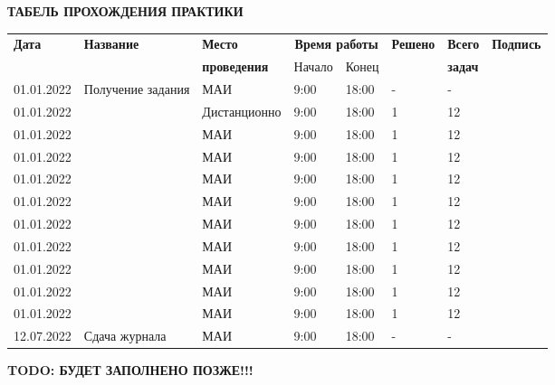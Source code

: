 \begin{center}
\bfseries{\large ТАБЕЛЬ ПРОХОЖДЕНИЯ ПРАКТИКИ}
\end{center}

\begin{longtable}{|p{1.75cm}|p{2cm}|p{2.75cm}|p{1.25cm}|p{1.25cm}|p{1.5cm}|p{1.25cm}|p{2cm}|}
    \hline
    {\bfseries Дата} & {\bfseries Название} & {\bfseries Место} & \multicolumn{2}{c|}{{\bfseries Время работы}} & {\bfseries Решено} & {\bfseries Всего} & {\bfseries Подпись}\\
    \cline {4-5} & & {\bfseries проведения} & Начало & Конец & & {\bfseries задач} & \\
    \hline
    01.01.2022 & Получение задания & МАИ & 9:00 & 18:00 & - & - & \\
    \hline
    01.01.2022 &  & Дистанционно & 9:00 & 18:00 & 1 & 12 & \\
    \hline
    01.01.2022 &  & МАИ & 9:00 & 18:00 & 1 & 12 & \\
    \hline
    01.01.2022 &  & МАИ & 9:00 & 18:00 & 1 & 12 & \\
    \hline
    01.01.2022 &  & МАИ & 9:00 & 18:00 & 1 & 12 & \\
    \hline
    01.01.2022 &  & МАИ & 9:00 & 18:00 & 1 & 12 & \\
    \hline
    01.01.2022 &  & МАИ & 9:00 & 18:00 & 1 & 12 & \\
    \hline
    01.01.2022 &  & МАИ & 9:00 & 18:00 & 1 & 12 & \\
    \hline
    01.01.2022 &  & МАИ & 9:00 & 18:00 & 1 & 12 & \\
    \hline
    01.01.2022 &  & МАИ & 9:00 & 18:00 & 1 & 12 & \\
    \hline
    01.01.2022 &  & МАИ & 9:00 & 18:00 & 1 & 12 & \\
    \hline
    12.07.2022 & Сдача журнала & МАИ & 9:00 & 18:00 & - & - &  \\
    \hline
\end{longtable}

\begin{center}
\bfseries{\large TODO: БУДЕТ ЗАПОЛНЕНО ПОЗЖЕ!!!}
\end{center}

\pagebreak
